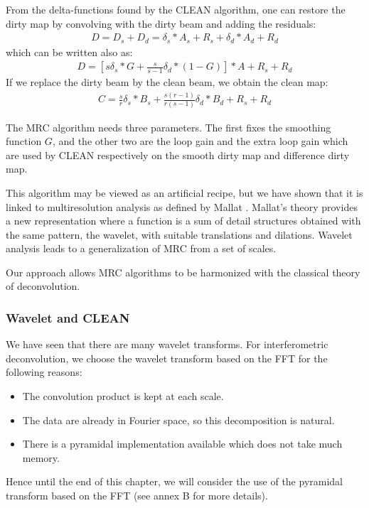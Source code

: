 \documentclass[11pt,a4paper]{article}
\begin{document}
From the delta-functions found by the CLEAN algorithm, one can restore
the dirty map by convolving with the dirty beam and adding the residuals:
\begin{eqnarray}
D = D_s + D_d = \delta_s*A_s+R_s + \delta_d*A_d+R_d
\end{eqnarray}
which can be written also as:
\begin{eqnarray}
D = [s\delta_s*G + \frac{s}{s-1}\delta_d*(1-G)]*A+ R_s+R_d
\end{eqnarray}
If we replace the dirty beam by the clean beam, we obtain the clean map:
\begin{eqnarray}
C = \frac{s}{r}\delta_s * B_s + \frac{s(r-1)}{r(s-1)}\delta_d
* B_d+R_s+R_d
\end{eqnarray}

The MRC algorithm  needs three parameters.
The first fixes the smoothing function  $G$, and the other two are the 
 loop gain and the  extra loop gain which are used by  CLEAN respectively
on the smooth dirty map and  difference dirty map.

This algorithm may be viewed as an artificial recipe, but we have
shown \cite{aper:starck91} that it is linked to 
multiresolution analysis as defined by Mallat \cite{wave:mallat89}. 
Mallat's theory provides a new representation where a
function is a sum of detail structures obtained with the same pattern, the
wavelet, with suitable translations and dilations. Wavelet analysis
leads to a generalization of MRC from a set of scales.

Our approach allows MRC algorithms to be harmonized with the
classical theory of deconvolution.

\subsubsection{Wavelet and CLEAN}

We have seen that there are many wavelet transforms. For interferometric
deconvolution, we choose the wavelet transform based on the FFT 
\cite{starck:sta94_3,starck:sta94_4,starck:book98} for
the following reasons:
\begin{itemize}
\item The convolution product is kept at each scale.
\item The data are already in Fourier space, so this decomposition
is natural.
\item There is a pyramidal implementation available which does not take 
much memory.
\end{itemize}
Hence until the end of this chapter, we will consider the use of the
pyramidal transform based on the FFT (see annex B for more details).
\end{document}
